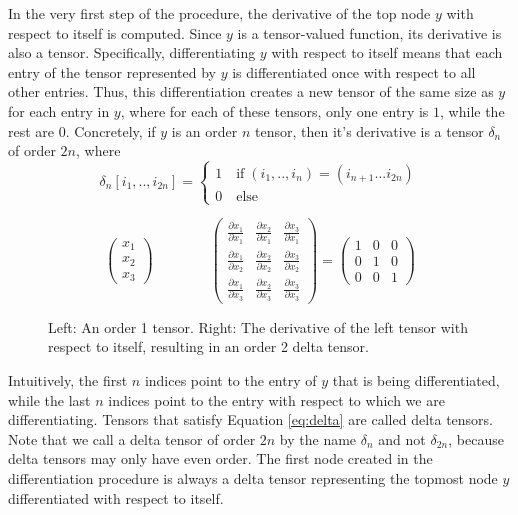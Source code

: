 \documentclass[12pt, a4paper]{report}
\begin{document}
In the very first step of the procedure, the derivative of the top node $y$ with respect to itself is computed.
Since $y$ is a tensor-valued function, its derivative is also a tensor.
Specifically, differentiating $y$ with respect to itself means that each entry of the tensor represented by $y$ is differentiated once with respect to all other entries.
Thus, this differentiation creates a new tensor of the same size as $y$ for each entry in $y$, where for each of these tensors, only one entry is $1$, while the rest are $0$.
Concretely, if $y$ is an order $n$ tensor, then it's derivative is a tensor $\delta_n$ of order $2n$, where
\begin{equation}
    \delta_n[i_1,..,i_{2n}] = 
    \begin{cases}
        1 \quad \text{if} \; (i_1,..,i_n) = (i_{n+1}...i_{2n}) \\
        0 \quad \text{else}
    \end{cases}
    \label{eq:delta}
\end{equation}
\begin{figure}
    $$
    \begin{pmatrix}
        x_1\\
        x_2\\
        x_3
    \end{pmatrix} \quad \quad \quad \quad 
    \begin{pmatrix}
        \frac{\partial x_1}{\partial x_1} & \frac{\partial x_2}{\partial x_1} & \frac{\partial x_3}{\partial x_1} \\
        \frac{\partial x_1}{\partial x_2} & \frac{\partial x_2}{\partial x_2} & \frac{\partial x_3}{\partial x_2} \\
        \frac{\partial x_1}{\partial x_3} & \frac{\partial x_2}{\partial x_3} & \frac{\partial x_3}{\partial x_3}
    \end{pmatrix}
    =
    \begin{pmatrix}
        1 & 0 & 0 \\
        0 & 1 & 0 \\
        0 & 0 & 1
    \end{pmatrix}
    $$
    \caption{Left: An order 1 tensor. Right: The derivative of the left tensor with respect to itself, resulting in an order 2 delta tensor.}
\end{figure}
Intuitively, the first $n$ indices point to the entry of $y$ that is being differentiated, while the last $n$ indices point to the entry with respect to which we are differentiating.
Tensors that satisfy Equation \ref{eq:delta} are called delta tensors.
Note that we call a delta tensor of order $2n$ by the name $\delta_n$ and not $\delta_{2n}$, because delta tensors may only have even order.
The first node created in the differentiation procedure is always a delta tensor representing the topmost node $y$ differentiated with respect to itself.
\end{document}
